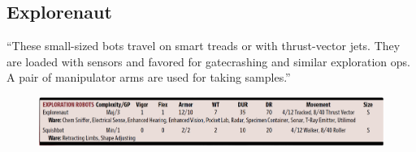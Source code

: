 \subsection{Explorenaut}

“These small-sized bots travel on smart treads or with thrust-vector jets. They are loaded with sensors and favored for gatecrashing and similar exploration ops. A pair of manipulator arms are used for taking samples.” \citep[pg. 347]{ep2e_1.1_2019}

\begin{figure}[h]
    \includegraphics[width=\textwidth]{img/explorationRobots.png}
\end{figure}

